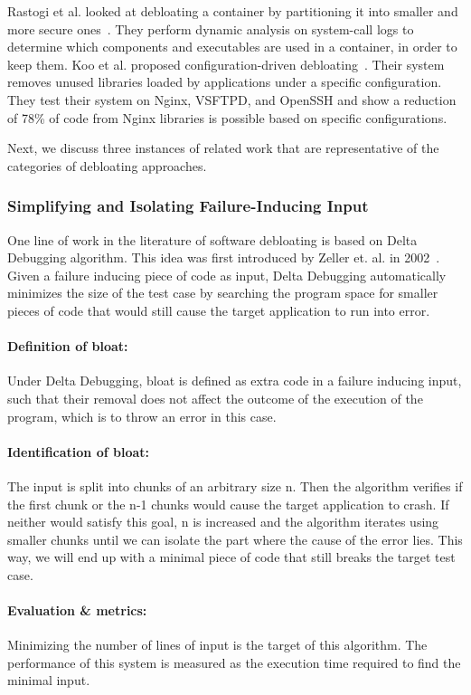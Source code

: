 Rastogi et al. looked at debloating a container by partitioning it into smaller and more secure ones~\cite{rastogi2017Cimplifier}. They perform dynamic analysis on system-call logs to determine which components and executables are used in a container, in order to keep them. Koo et al. proposed configuration-driven debloating~\cite{Koo:2019:CSD:3301417.3312501}. Their system removes unused libraries loaded by applications under a specific configuration. They test their system on Nginx, VSFTPD, and OpenSSH and show a reduction of 78\% of code from Nginx libraries is possible based on specific configurations.

Next, we discuss three instances of related work that are representative of the categories of debloating approaches.

\subsubsection{Simplifying and Isolating Failure-Inducing Input}
One line of work in the literature of software debloating is based on Delta Debugging algorithm. This idea was first introduced by Zeller et. al. in 2002~\cite{zeller2002Delta}.
Given a failure inducing piece of code as input, Delta Debugging automatically minimizes the size of the test case by searching the program space for smaller pieces of code that would still cause the target application to run into error.

\paragraph{Definition of bloat:} Under Delta Debugging, bloat is defined as extra code in a failure inducing input, such that their removal does not affect the outcome of the execution of the program, which is to throw an error in this case.
\paragraph{Identification of bloat:} The input is split into chunks of an arbitrary size n. Then the algorithm verifies if the first chunk or the n-1 chunks would cause the target application to crash. If neither would satisfy this goal, n is increased and the algorithm iterates using smaller chunks until we can isolate the part where the cause of the error lies. This way, we will end up with a minimal piece of code that still breaks the target test case.
\paragraph{Evaluation \& metrics:} Minimizing the number of lines of input is the target of this algorithm. The performance of this system is measured as the execution time required to find the minimal input.

